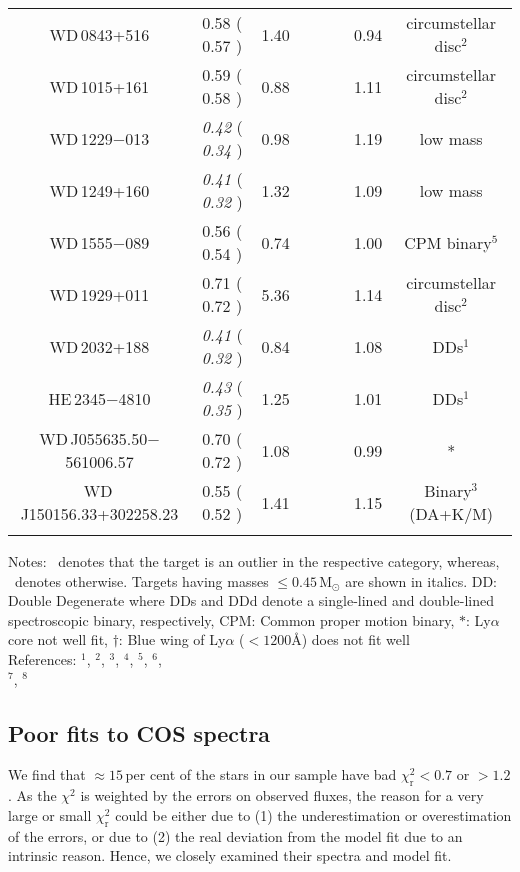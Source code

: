 \documentclass[fleqn,usenatbib, useAMS]{mnras}
\newcommand{\xmark}{\ding{53}}%
\newcommand{\Y}{\checkmark}%
\newcommand{\N}{\xmark}%
\newcommand{\Msun}{\mbox{$\mathrm{M_\odot}$}}
\begin{document}
\begin{table*}
\begin{tabular}{cccccccc}
WD\,0843+516	&	0.58	(	0.57	)	&	1.40	&	\N	&	\N	&	\N	&	0.94	&	circumstellar disc$^2$	\\
WD\,1015+161	&	0.59	(	0.58	)	&	0.88	&	\N	&	\N	&	\N	&	1.11	&	circumstellar disc$^2$	\\
WD\,1229$-$013	&	\textit{0.42}	(	\textit{0.34}	)	&	0.98	&	\N	&	\N	&	\N	&	1.19	&	low mass	\\
WD\,1249+160	&	\textit{0.41}	(	\textit{0.32}	)	&	1.32	&	\N	&	\N	&	\N	&	1.09	&	low mass	\\
WD\,1555$-$089	&	0.56	(	0.54	)	&	0.74	&	\N	&	\N	&	\N	&	1.00	&	CPM binary$^5$	\\
WD\,1929+011	&	0.71	(	0.72	)	&	5.36	&	\N	&	\N	&	\N	&	1.14	&	circumstellar disc$^2$	\\
WD\,2032+188	&	\textit{0.41}	(	\textit{0.32}	)	&	0.84	&	\N	&	\N	&	\N	&	1.08	&	DDs$^1$	\\
HE\,2345$-$4810	&	\textit{0.43}	(	\textit{0.35}	)	&	1.25	&	\N	&	\N	&	\N	&	1.01	&	DDs$^1$	\\
WD\,J055635.50$-$561006.57	&	0.70	(	0.72	)	&	1.08	&	\N	&	\N	&	\N	&	0.99	&	*	\\
WD\,J150156.33+302258.23	&	0.55	(	0.52	)	&	1.41	&	\N	&	\N	&	\N	&	1.15	&	Binary$^3$ (DA+K/M)	\\\hline
\label{tab:outliers_summ}
\end{tabular}
\begin{tablenotes}\footnotesize
    \small
    \item Notes: \Y\ denotes that the target is an outlier in the respective category, whereas, \N\ denotes otherwise. Targets having masses $\leq0.45\,\Msun$ are shown in italics. DD: Double Degenerate where DDs and DDd denote a single-lined and double-lined spectroscopic binary, respectively, CPM: Common proper motion binary, $*$: Ly$\alpha$ core not well fit, $\dagger$: Blue wing of Ly$\alpha$ ($<1200$\AA) does not fit well\\
    References:
    $^1$\cite{Koester2009}, $^2$\cite{boris2012}, 
    $^3$\cite{mccook1999}, 
    $^4$\cite{ferrario2015},
    $^5$\cite{1991ApJ...375..674W},
    $^6$\cite{2000MNRAS.319..305M},\\
    $^7$\cite{2015MNRAS.449..574R},
    $^8$\cite{Napiwotzki2020}
\end{tablenotes}
\end{table*}

\subsection{Poor fits to COS spectra}
\label{sec:poor_fits}
We find that $\approx15$\,per cent of the stars in our sample have bad $\chi^{2}_\mathrm{r}<0.7$ or $>1.2$. As the $\chi^{2}$ is weighted by the errors on observed fluxes, the reason for a very large or small $\chi^{2}_\mathrm{r}$ could be either due to (1) the underestimation or overestimation of the errors, or due to (2) the real deviation from the model fit due to an intrinsic reason. Hence, we closely examined their spectra and model fit. 
\end{document}
